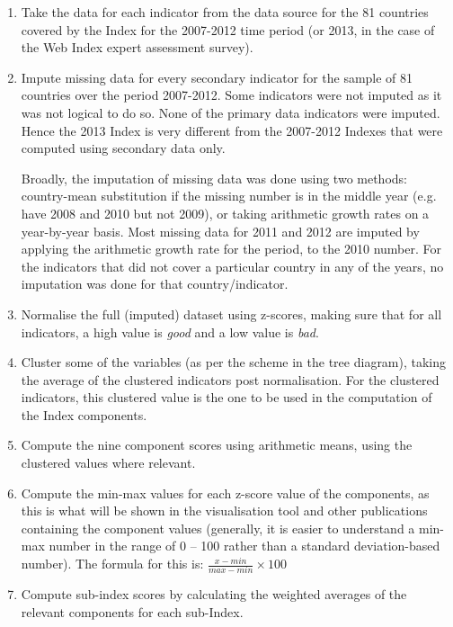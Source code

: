 \documentclass{acm_proc_article-sp}
\begin{document}
\begin{enumerate}

\item Take the data for each indicator from the data source for the 81 countries covered by the Index for the 2007-2012 time period (or 2013, in the case of the Web Index expert assessment survey).

\item Impute missing data for every secondary indicator for the sample of 81 countries over the period 2007-2012. Some indicators were not imputed as it was not logical to do so. None of the primary data indicators were imputed. Hence the 2013 Index is very different from the 2007-2012 Indexes that were computed using secondary data only.

Broadly, the imputation of missing data was done using two methods: country-mean substitution if the missing number is in the middle year (e.g. have 2008 and 2010 but not 2009), or taking arithmetic growth rates on a year-by-year basis. Most missing data for 2011 and 2012 are imputed by applying the arithmetic growth rate for the period, to the 2010 number. For the indicators that did not cover a particular country in any of the years, no imputation was done for that country/indicator.

\item Normalise the full (imputed) dataset using z-scores, making sure that for all indicators, a high value is \emph{good} and a low value is \emph{bad}.

\item Cluster some of the variables (as per the scheme in the tree diagram), taking the average of the clustered indicators post normalisation. For the clustered indicators, this clustered value is the one to be used in the computation of the Index components.

\item Compute the nine component scores using arithmetic means, 
 using the clustered values where relevant.

\item Compute the min-max values for each z-score value of the components, 
 as this is what will be shown in the visualisation tool and other 
 publications containing the component values (generally, it is easier to understand 
 a min-max number in the range of 0 – 100 rather than a standard deviation-based number). 
 The formula for this is: $\frac{x-min}{max-min}\times{}100$

\item Compute sub-index scores by calculating the weighted averages of the relevant components for each sub-Index.


\end{enumerate}
\end{document}
